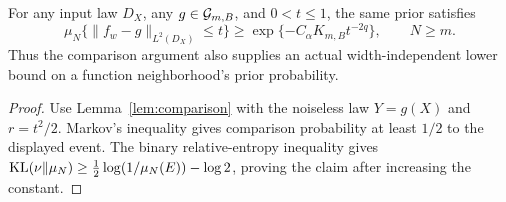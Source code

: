 \begin{corollary}\label{cor:mass}
For any input law $D_X$, any $g\in\mathcal G_{m,B}$, and $0<t\le1$, the same prior satisfies
\begin{equation}
 \mu_N\{\|f_w-g\|_{L^2(D_X)}\le t\}
 \ge \exp\{-C_\alpha K_{m,B}t^{-2q}\},
 \qquad N\ge m.
 \label{eq:function-mass}
\end{equation}
Thus the comparison argument also supplies an actual width-independent lower bound on a function neighborhood's prior probability.
\end{corollary}
\begin{proof}
Use Lemma~\ref{lem:comparison} with the noiseless law $Y=g(X)$ and $r=t^2/2$. Markov's inequality gives comparison probability at least $1/2$ to the displayed event. The binary relative-entropy inequality gives $\operatorname{KL}(\nu\|\mu_N)\ge\tfrac12\log(1/\mu_N(E))-\log2$, proving the claim after increasing the constant.
\end{proof}
